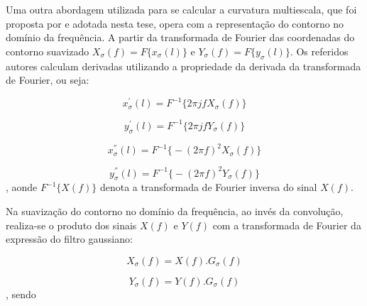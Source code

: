 Uma outra abordagem utilizada para se calcular a curvatura multiescala, que foi proposta por  e adotada nesta tese, opera com a representação do contorno no domínio da frequência. A partir da transformada de Fourier das coordenadas do contorno suavizado $X_{\sigma}(f) = F\big\{x_{\sigma}(l)\big\}$ e $Y_{\sigma}(f) = F\big\{y_{\sigma}(l)\big\}$. Os referidos autores calculam derivadas utilizando a propriedade da derivada da transformada de Fourier, ou seja:

\begin{equation}
x_{\sigma}^{'}(l) = F^{-1}\big\{2 \pi j f  X_{\sigma}(f)\big\}
\end{equation}

\begin{equation}
y_{\sigma}^{'}(l) = F^{-1}\big\{2 \pi j f  Y_{\sigma}(f)\big\}
\end{equation}

\begin{equation}
x_{\sigma}^{''}(l) = F^{-1}\big\{- (2 \pi f)^2 X_{\sigma}(f)\big\}
\end{equation}

\begin{equation}
y_{\sigma}^{''}(l) = F^{-1}\big\{- (2 \pi f)^2 Y_{\sigma}(f)\big\}
\end{equation}, aonde $F^{-1}\big\{X(f)\big\}$ denota a transformada de Fourier inversa do sinal $X(f)$.

\begin{comment}
\begin{equation}
X(f) = F\big\{x(l)\big\} = \int\limits^\infty_\infty x(l)e^{-2 \pi j f l}dl
\end{equation}

\begin{equation}
x(l) = F^{-1}\big\{X(f)\big\} \int\limits^\infty_\infty X(f)e^{2 \pi j f l}df
\end{equation}
\end{comment}

Na suavização do contorno no domínio da frequência, ao invés da convolução, realiza-se o produto dos sinais $X(f)$ e $Y(f)$ com a transformada de Fourier da expressão do filtro gaussiano:

\begin{equation}
X_\sigma(f) = X(f).G_\sigma(f)
\end{equation}

\begin{equation}
Y_\sigma(f) = Y(f).G_\sigma(f)
\end{equation}, sendo

